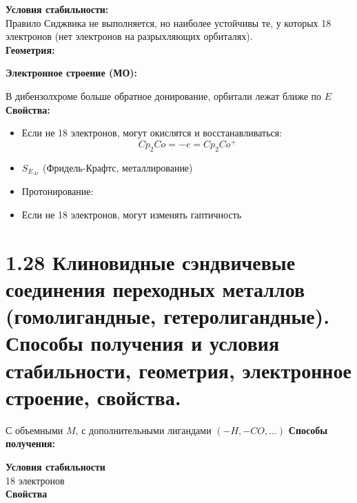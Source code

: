\textbf{Условия стабильности:}\\
Правило Сиджвика не выполняется, но наиболее устойчивы те, у которых 18 электронов (нет электронов на разрыхляющих орбиталях). \\
\textbf{Геометрия:}\\
\begin{figure} [H]
	\centering {\texttt{[image: xx4]}}
\end{figure}
\textbf{Электронное строение (МО):}\\
\begin{figure} [H]
	\centering {\texttt{[image: xx5]}}
\end{figure}
В дибензолхроме больше обратное донирование, орбитали лежат ближе по $E$ 
\textbf{Свойства:}\\
\begin{itemize}
	\item Если не 18 электронов, могут окислятся и восстанавливаться:
	\[
	Cp_2Co = -e = Cp_2Co^{+}
	\]
	\item $S_{E_{Ar}}$ (Фридель-Крафтс, металлирование)
	\item Протонирование:
	\begin{figure} [H]
		\centering {\texttt{[image: xx6]}}
	\end{figure}
	\item Если не 18 электронов, могут изменять гаптичность
\end{itemize}


\section*{1.28 Клиновидные сэндвичевые соединения переходных металлов (гомолигандные, гетеролигандные). Способы получения и условия стабильности, геометрия, электронное строение, свойства.}
\begin{figure} [H]
	\centering {\texttt{[image: ss1]}}
\end{figure}
С объемными $M$, с дополнительными лигандами $(-H, -CO, ...)$
\textbf{Способы получения:}\\
\begin{figure} [H]
	\centering {\texttt{[image: ss2]}}
\end{figure}
\textbf{Условия стабильности}\\
18 электронов \\
\textbf{Свойства}\\
\begin{figure} [H]
	\centering {\texttt{[image: ss3]}}
\end{figure}

